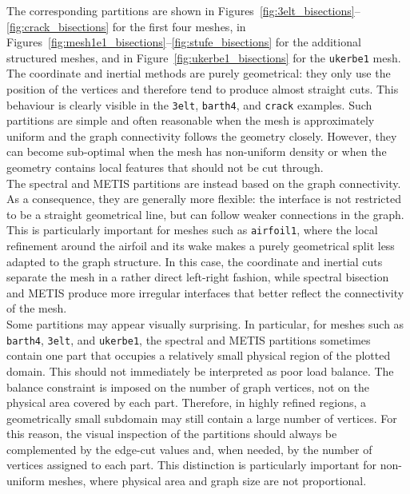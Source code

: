 \documentclass[unicode,10pt,a4paper,oneside,numbers=endperiod,openany]{scrartcl}
\begin{document}
The corresponding partitions are shown in Figures~\ref{fig:3elt_bisections}--\ref{fig:crack_bisections} for the first four meshes, in Figures~\ref{fig:mesh1e1_bisections}--\ref{fig:stufe_bisections} for the additional structured meshes, and in Figure~\ref{fig:ukerbe1_bisections} for the \texttt{ukerbe1} mesh.
The coordinate and inertial methods are purely geometrical: they only use the position of the
vertices and therefore tend to produce almost straight cuts. This behaviour is clearly visible in
the \texttt{3elt}, \texttt{barth4}, and \texttt{crack} examples. Such partitions are simple and often
reasonable when the mesh is approximately uniform and the graph connectivity follows the
geometry closely. However, they can become sub-optimal when the mesh has non-uniform density
or when the geometry contains local features that should not be cut through.\\

The spectral and METIS partitions are instead based on the graph connectivity. As a consequence,
they are generally more flexible: the interface is not restricted to be a straight geometrical line,
but can follow weaker connections in the graph. This is particularly important for meshes such as
\texttt{airfoil1}, where the local refinement around the airfoil and its wake makes a purely
geometrical split less adapted to the graph structure. In this case, the coordinate and inertial
cuts separate the mesh in a rather direct left-right fashion, while spectral bisection and METIS
produce more irregular interfaces that better reflect the connectivity of the mesh.\\

Some partitions may appear visually surprising. In particular, for meshes such as \texttt{barth4},
\texttt{3elt}, and \texttt{ukerbe1}, the spectral and METIS partitions sometimes contain one part that
occupies a relatively small physical region of the plotted domain. This should not immediately be
interpreted as poor load balance. The balance constraint is imposed on the number of graph vertices,
not on the physical area covered by each part. Therefore, in highly refined regions, a geometrically small
subdomain may still contain a large number of vertices. For this reason, the visual inspection of the
partitions should always be complemented by the edge-cut values and, when needed, by the number of
vertices assigned to each part. This distinction is particularly important for non-uniform meshes, where
physical area and graph size are not proportional.\\
\end{document}
